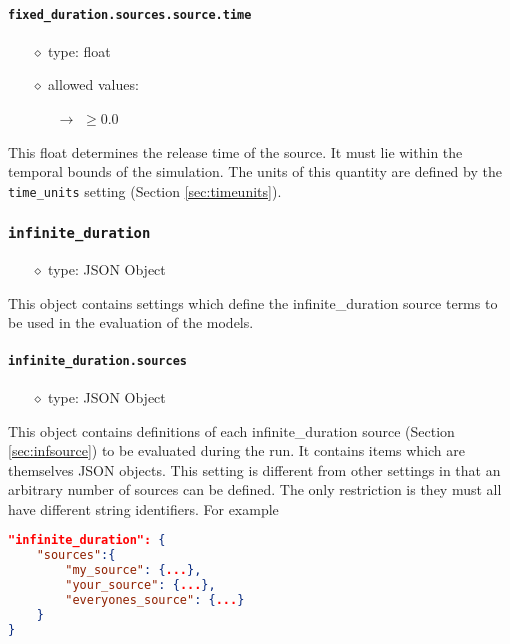 \documentclass[]{article}
\def\code#1{\texttt{#1}}
\begin{document}
\paragraph{\code{fixed\_duration.sources.source.time}}\label{sec:fixsourcetime}
\begin{itemize}
    \item[$\diamond$] type: float 
    \item[$\diamond$] allowed values:
    \begin{itemize}
        \item[$\rightarrow$] $\geq0.0$
    \end{itemize}
\end{itemize}
This float determines the release time of the source. It must lie within the
temporal bounds of the simulation. The units of this quantity are defined by the
\code{time\_units} setting (Section \ref{sec:timeunits}).

\subsubsection{\code{infinite\_duration}}
\begin{itemize}
    \item[$\diamond$] type: JSON Object 
\end{itemize}
This object contains settings which define the infinite\_duration source terms to be
used in the evaluation of the models.

\paragraph{\code{infinite\_duration.sources}}\label{sec:infsources}
\begin{itemize}
    \item[$\diamond$] type: JSON Object 
\end{itemize}
This object contains definitions of each infinite\_duration source (Section
\ref{sec:infsource}) to be evaluated during the run. It contains items which
are themselves JSON objects. This setting is different from other settings in
that an arbitrary number of sources can be defined. The only restriction is they
must all have different string identifiers. For example\\
\begin{lstlisting}[language=json,firstnumber=1]
"infinite_duration": {
    "sources":{
        "my_source": {...},
        "your_source": {...},
        "everyones_source": {...}
    }
}
\end{lstlisting}
\medskip
\end{document}
